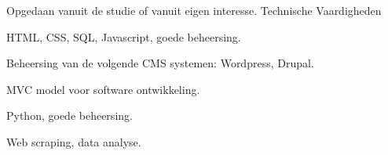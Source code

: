   \begin{cventries}
  \cventry
    {Opgedaan vanuit de studie of vanuit eigen interesse.}
    {Technische Vaardigheden}
    {}
    {}
    {
      \begin{cvitems}
        \item {HTML, CSS, SQL, Javascript, goede beheersing.}
        \item {Beheersing van de volgende CMS systemen: Wordpress, Drupal.}
        \item {MVC model voor software ontwikkeling.}
        \item {Python, goede beheersing.}
        \item {Web scraping, data analyse.}
      \end{cvitems}
    }
\end{cventries}